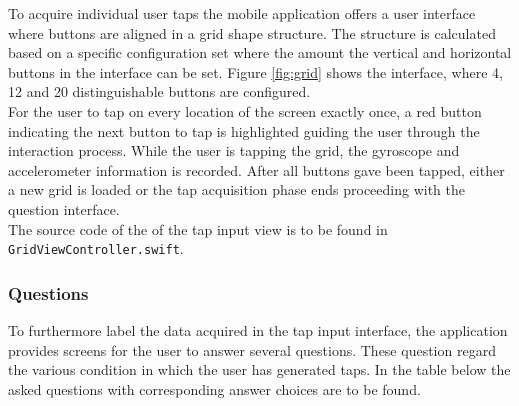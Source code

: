 To acquire individual user taps the mobile application offers a user interface where buttons are aligned in a grid shape structure. The structure is calculated based on a specific configuration set where the amount the vertical and horizontal buttons in the interface can be set. Figure \ref{fig:grid} shows the interface, where 4, 12 and 20 distinguishable buttons are configured.\\

For the user to tap on every location of the screen exactly once, a red button indicating the next button to tap is highlighted guiding the user through the interaction process. While the user is tapping the grid, the gyroscope and accelerometer information is recorded. After all buttons gave been tapped, either a new grid is loaded or the tap acquisition phase ends proceeding with the question interface.\\



The source code of the of the tap input view is to be found in \texttt{GridViewController.swift}.


\subsubsection{Questions}
To furthermore label the data acquired in the tap input interface, the application provides screens for the user to answer several questions. These question regard the various condition in which the user has generated taps. In the table below the asked questions with corresponding answer choices are to be found.

